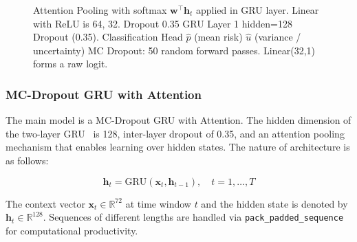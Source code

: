 \documentclass[runningheads]{llncs}
\begin{document}
\begin{figure}[t]
\caption{Attention Pooling with softmax $\mathbf{w}^\top \mathbf{h}_t$ applied in GRU layer. Linear with ReLU is 64, 32. Dropout 0.35 GRU Layer 1 hidden=128 Dropout (0.35). Classification Head $\hat{p}$ (mean risk) $\hat{u}$ (variance / uncertainty) MC Dropout: 50 random forward passes. Linear(32,1) forms a raw logit.}
\label{fig:model_arch}
\end{figure}

\subsubsection{MC-Dropout GRU with Attention}
The main model is a MC-Dropout GRU with Attention. The hidden dimension of the two-layer GRU~\cite{Cho2014} is 128, inter-layer dropout of 0.35, and an attention pooling mechanism that enables learning over hidden states. The nature of architecture is as follows:

\begin{equation}
\mathbf{h}_t = \text{GRU}(\mathbf{x}_t, \mathbf{h}_{t-1}), \quad t = 1, \ldots, T
\end{equation}

The context vector $\mathbf{x}_t \in \mathbb{R}^{72}$ at time window $t$ and the hidden state is denoted by $\mathbf{h}_t \in \mathbb{R}^{128}$. Sequences of different lengths are handled via \texttt{pack\_padded\_sequence} for computational productivity.
\end{document}
